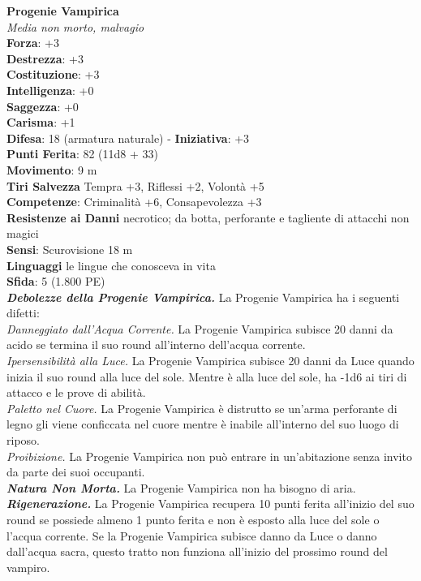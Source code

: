 \begin{multicols}{2}
\medskip\textbf{Progenie Vampirica}\\
\emph{Media non morto, malvagio}\\
\textbf{Forza}: +3\\
\textbf{Destrezza}: +3\\
\textbf{Costituzione}: +3\\
\textbf{Intelligenza}: +0\\
\textbf{Saggezza}: +0\\
\textbf{Carisma}: +1\\
\textbf{Difesa}: 18 (armatura naturale) - \textbf{Iniziativa}: +3\\
\textbf{Punti Ferita}: 82 (11d8 + 33)\\
\textbf{Movimento}: 9 m\\
\textbf{Tiri Salvezza} Tempra +3, Riflessi +2, Volontà +5\\
\textbf{Competenze}: Criminalità +6, Consapevolezza +3\\
\textbf{Resistenze ai Danni} necrotico; da botta, perforante e tagliente di attacchi non magici\\
\textbf{Sensi}: Scurovisione 18 m \\
\textbf{Linguaggi} le lingue che conosceva in vita\\
\textbf{Sfida}: 5 (1.800 PE)\smallskip\\
\emph{\textbf{Debolezze della Progenie Vampirica.}} La Progenie Vampirica ha i seguenti difetti:\\
\emph{Danneggiato dall'Acqua Corrente.} La Progenie Vampirica subisce 20 danni da acido se termina il suo round all'interno dell'acqua corrente.\\
\emph{Ipersensibilità alla Luce.} La Progenie Vampirica subisce 20 danni da Luce quando inizia il suo round alla luce del sole. Mentre è alla luce del sole, ha -1d6 ai tiri di attacco e le prove di abilità.\\
\emph{Paletto nel Cuore.} La Progenie Vampirica è distrutto se un'arma perforante di legno gli viene conficcata nel cuore mentre è inabile all'interno del suo luogo di riposo.\\
\emph{Proibizione.} La Progenie Vampirica non può entrare in un'abitazione senza invito da parte dei suoi occupanti.\\
\emph{\textbf{Natura Non Morta.}} La Progenie Vampirica non ha bisogno di aria.\\

\emph{\textbf{Rigenerazione.}} La Progenie Vampirica recupera 10 punti ferita all'inizio del suo round se possiede almeno 1 punto ferita e non è esposto alla luce del sole o l'acqua corrente. Se la Progenie Vampirica subisce danno da Luce o danno dall'acqua sacra, questo tratto non funziona all'inizio del prossimo round del vampiro.\\


\end{multicols}
